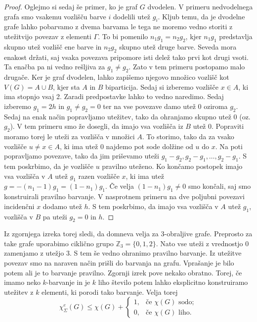 \documentclass[12pt,a4paper,twoside]{article}
\theoremstyle{definition} %
\theoremstyle{plain} %
\newcommand{\ec}{\chi_{\Sigma}^e}
\numberwithin{equation}{section}  %
\begin{document}
\begin{proof}
	Oglejmo si sedaj še primer, ko je graf $G$ dvodelen. V primeru nedvodelnega grafa smo vsakemu vozlišču barve $i$ dodelili utež $g_i$. Kljub temu, da je dvodelne grafe lahko pobarvamo z dvema barvama le tega ne moremo vedno storiti z utežitvijo povezav z elementi $\Gamma$. To bi pomenilo $n_1 g_1 = n_2 g_2$, kjer $n_1 g_1$ predstavlja skupno utež vozlišč ene barve in $n_2 g_2$ skupno utež druge barve. Seveda mora enakost držati, saj vsaka povezava pripomore isti delež tako prvi kot drugi vsoti. Ta enačba pa ni vedno rešljiva za $g_1 \neq g_2$. Zato v tem primeru postopamo malo drugače. Ker je graf dvodelen, lahko zapišemo njegovo množico vozlišč kot $V(G) = A \cup B$, kjer sta $A$ in $B$ biparticija. Sedaj si izberemo vozlišče $x \in A$, ki ima stopnjo vsaj 2. Zaradi predpostavke lahko to vedno naredimo. Sedaj izberemo $g_1 = 2h$ in $g_1 \neq g_2 = 0$ ter na vse povezave damo utež 0 oziroma $g_2$. Sedaj na enak način popravljamo utežitev, tako da ohranjamo skupno utež 0 (oz. $g_2$). V tem primeru smo že dosegli, da imajo vsa vozlišča iz $B$ utež 0. Popraviti moramo torej le uteži za vozlišča v množici $A$. To storimo, tako da za vsako vozlišče $u \neq x \in A$, ki ima utež 0 najdemo pot sode dolžine od $u$ do $x$. Na poti popravljamo povezave, tako da jim priševamo uteži $g_1 - g_2, g_2 - g_1, \ldots, g_2 - g_1$. S tem poskrbimo, da je vozlišče $u$ pravilno uteženo. Ko končamo postopek imajo vsa vozlišča v $A$ utež $g_1$ razen vozlišče $x$, ki ima utež $g = -(n_1 - 1) g_1 = (1 - n_1) g_1$. Če velja $(1 - n_1)g_1 \neq 0$ smo končali, saj smo konstruirali pravilno barvanje. V nasprotnem primeru na dve poljubni povezavi incidenčni $x$ dodamo utež $h$. S tem poskrbimo, da imajo vsa vozlišča v $A$ utež $g_1$, vozlišča v $B$ pa uteži $g_2 = 0$ in $h$.
\end{proof}

Iz zgornjega izreka torej sledi, da domneva velja za $3$-obraljive grafe. Preprosto za take grafe uporabimo ciklično grupo $\mathbb{Z}_3 = \{0,1,2\}$. Nato vse uteži z vrednostjo $0$ zamenjamo z utežjo $3$. S tem še vedno ohranimo pravilno barvanje. Iz utežitve povezav smo na naraven način prišli do barvanja na grafu. Vprašanje je bilo potem ali je to barvanje pravilno. Zgornji izrek pove nekako obratno. Torej, če imamo neko $k$-barvanje in je $k$ liho število potem lahko eksplicitno konstruiramo utežitev z $k$ elementi, ki porodi tako barvanje. Velja torej
$$ \ec(G) \le \chi(G) + \begin{cases}
1, &\text{če } \chi(G) \text{ sodo};\\
0, & \text{če } \chi(G) \text{ liho}.
\end{cases}$$ 
\end{document}
